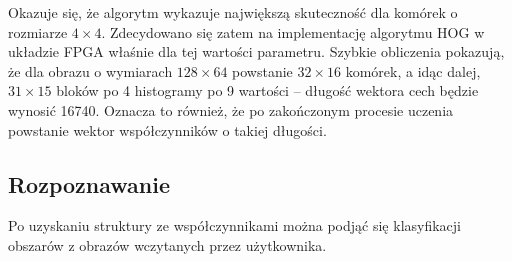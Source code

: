 Okazuje się, że algorytm wykazuje największą skuteczność dla komórek o rozmiarze $4\times 4$. 
Zdecydowano się zatem na implementację algorytmu HOG w układzie FPGA właśnie dla tej wartości parametru. 
Szybkie obliczenia pokazują, że dla obrazu o wymiarach $128\times 64$ powstanie $32\times 16$ komórek, a idąc dalej, $31\times 15$ bloków po 4 histogramy po 9 wartości -- długość wektora cech będzie wynosić 16740. 
Oznacza to również, że po zakończonym procesie uczenia powstanie wektor współczynników o takiej długości. %





\subsection{Rozpoznawanie}
Po uzyskaniu struktury ze współczynnikami można podjąć się klasyfikacji obszarów z obrazów wczytanych przez użytkownika.

